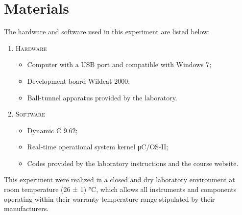 \section{Materials}

The hardware and software used in this experiment are listed below:

\begin{enumerate}[]
\item \textsc{Hardware}
\begin{itemize}[label={--}]
\item Computer with a USB port and compatible with Windows 7;
\item Development board Wildcat 2000;
\item Ball-tunnel apparatus provided by the laboratory.
\end{itemize}

\item \textsc{Software}
\begin{itemize}[label={--}]
\item Dynamic C 9.62;
\item Real-time operational system kernel μC/OS-II;
\item Codes provided by the laboratory instructions and the course website.
\end{itemize}
\end{enumerate}

This experiment were realized in a closed and dry laboratory environment at room temperature (26 ± 1) °C, which allows all instruments and components operating within their warranty temperature range stipulated by their manufacturers.
